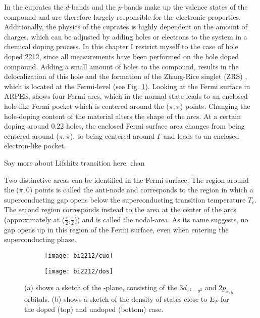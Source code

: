 In the cuprates the  $d$-bands and the  $p$-bands make up the valence states of the compound and are therefore largely responsible for the electronic properties.
Additionally, the physics of the cuprates is highly dependent on the amount of charges, which can be adjusted by adding holes or electrons to the system in a chemical doping process.
In this chapter I restrict myself to the case of hole doped 2212, since all measurements have been performed on the hole doped compound.
Adding a small amount of holes to the compound, results in the delocalization of this hole and the formation of the Zhang-Rice singlet (ZRS) \cite{zhang_effective_1988}, which is located at the Fermi-level (see Fig. \ref{fig:cuo_dos}).
Looking at the Fermi surface in ARPES, shows four Fermi arcs, which in the normal state leads to an enclosed hole-like Fermi pocket which is centered around the ($\pi, \pi$) points.
Changing the hole-doping content of the material alters the shape of the arcs.
At a certain doping around 0.22 holes, the enclosed Fermi surface area changes from being centered around ($\pi, \pi$), to being centered around $\Gamma$ and leads to an enclosed electron-like pocket.

Say more about Lifshitz transition here. chan

Two distinctive areas can be identified in the Fermi surface.
The region around the ($\pi, 0$) points is called the anti-node and corresponds to the region in which a superconducting gap opens below the superconducting transition temperature $T_c$.
The second region corresponds instead to the area at the center of the arcs (approximately at ($\frac{\pi}{2}$,$\frac{\pi}{2}$)) and is called the nodal-area.
As its name suggests, no gap opens up in this region of the Fermi surface, even when entering the superconducting phase.

\begin{figure}[t]
	\centering
	\begin{subfigure}[b]{0.49\textwidth}
		\texttt{[image: bi2212/cuo]}
		\caption{}
	\end{subfigure}
	\begin{subfigure}[b]{0.45\textwidth}
		\texttt{[image: bi2212/dos]}
		\caption{}
	\end{subfigure}
	\caption{(a) shows a sketch of the -plane, consisting of the  $3d_{x^2-y^2}$ and  $2p_{x,y}$ orbitals. (b) shows a sketch of the density of states close to $E_F$ for the doped (top) and undoped (bottom) case.}
	\label{fig:cuo_dos}
\end{figure}

